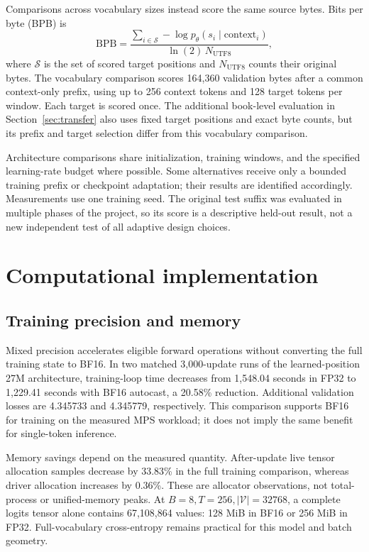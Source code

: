 \documentclass{article}
\begin{document}
Comparisons across vocabulary sizes instead score the same source bytes. Bits per byte (BPB) is
\begin{equation}
\mathrm{BPB}=
\frac{\sum_{i\in\mathcal S}-\log p_\theta(s_i\mid\mathrm{context}_i)}
{\ln(2)\,N_{\mathrm{UTF8}}},
\label{eq:bpb}
\end{equation}
where $\mathcal S$ is the set of scored target positions and $N_{\mathrm{UTF8}}$ counts their original bytes. The vocabulary comparison scores 164,360 validation bytes after a common context-only prefix, using up to 256 context tokens and 128 target tokens per window. Each target is scored once. The additional book-level evaluation in Section~\ref{sec:transfer} also uses fixed target positions and exact byte counts, but its prefix and target selection differ from this vocabulary comparison.

Architecture comparisons share initialization, training windows, and the specified learning-rate budget where possible. Some alternatives receive only a bounded training prefix or checkpoint adaptation; their results are identified accordingly. Measurements use one training seed. The original test suffix was evaluated in multiple phases of the project, so its score is a descriptive held-out result, not a new independent test of all adaptive design choices.

\section{Computational implementation}
\label{sec:implementation}
\subsection{Training precision and memory}
Mixed precision accelerates eligible forward operations without converting the full training state to BF16. In two matched 3,000-update runs of the learned-position 27M architecture, training-loop time decreases from 1,548.04 seconds in FP32 to 1,229.41 seconds with BF16 autocast, a 20.58\% reduction. Additional validation losses are 4.345733 and 4.345779, respectively. This comparison supports BF16 for training on the measured MPS workload; it does not imply the same benefit for single-token inference.

Memory savings depend on the measured quantity. After-update live tensor allocation samples decrease by 33.83\% in the full training comparison, whereas driver allocation increases by 0.36\%. These are allocator observations, not total-process or unified-memory peaks. At $B=8,T=256,|\mathcal V|=32768$, a complete logits tensor alone contains 67,108,864 values: 128 MiB in BF16 or 256 MiB in FP32. Full-vocabulary cross-entropy remains practical for this model and batch geometry.
\end{document}
